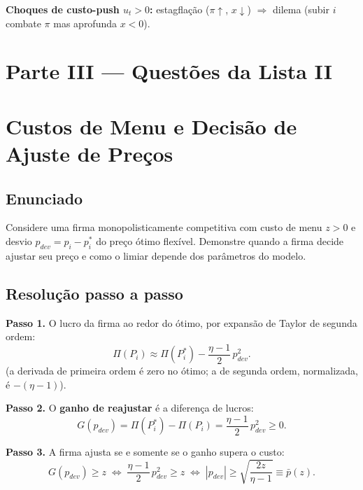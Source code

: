 \documentclass[12pt, a4paper]{article}
\begin{document}
\textbf{Choques de custo-push $u_t>0$:} estagflação ($\pi\uparrow$, $x\downarrow$)
$\Rightarrow$ dilema (subir $i$ combate $\pi$ mas aprofunda $x<0$).


\newpage
\section*{\large\color{cyanrbc} Parte III --- Questões da Lista II}

\setcounter{section}{0}

\section{Custos de Menu e Decisão de Ajuste de Preços}

\subsection*{Enunciado}
Considere uma firma monopolisticamente competitiva com custo de menu $z > 0$ e
desvio $p_{dev} = p_i - p_i^*$ do preço ótimo flexível. Demonstre quando a firma
decide ajustar seu preço e como o limiar depende dos parâmetros do modelo.

\subsection*{Resolução passo a passo}

\textbf{Passo 1.} O lucro da firma ao redor do ótimo, por expansão de Taylor de segunda
ordem:
\[
\Pi(P_i) \approx \Pi(P_i^*) - \frac{\eta-1}{2}\,p_{dev}^2.
\]
(a derivada de primeira ordem é zero no ótimo; a de segunda ordem, normalizada,
é $-(\eta-1)$).

\textbf{Passo 2.} O \textbf{ganho de reajustar} é a diferença de lucros:
\[
G(p_{dev}) = \Pi(P_i^*) - \Pi(P_i) = \frac{\eta-1}{2}\,p_{dev}^2 \geq 0.
\]

\textbf{Passo 3.} A firma ajusta se e somente se o ganho supera o custo:
\[
G(p_{dev}) \geq z
\;\Longleftrightarrow\;
\frac{\eta-1}{2}\,p_{dev}^2 \geq z
\;\Longleftrightarrow\;
|p_{dev}| \geq \sqrt{\frac{2z}{\eta-1}} \equiv \bar{p}(z).
\]
\end{document}
